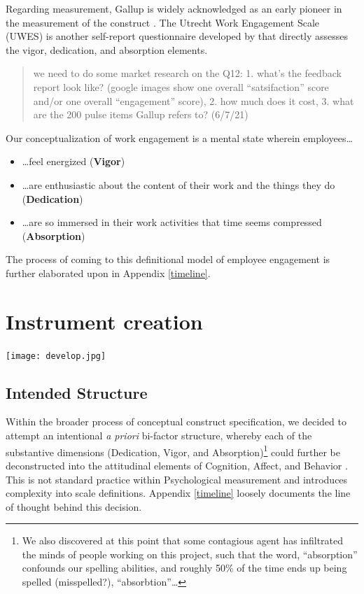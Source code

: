 \documentclass[
]{book}
\providecommand{\tightlist}{%
  \setlength{\itemsep}{0pt}\setlength{\parskip}{0pt}}
\begin{document}
Regarding measurement, Gallup is widely acknowledged as an early pioneer in the measurement of the construct \citep[see, for example,][]{coffman_hard_1999}. The Utrecht Work Engagement Scale (UWES) is another self-report questionnaire developed by \citet{schaufeli_uwesutrecht_2003} that directly assesses the vigor, dedication, and absorption elements.

\begin{quote}
we need to do some market research on the Q12: 1. what's the feedback report look like? (google images show one overall ``satsifaction'' score and/or one overall ``engagement'' score), 2. how much does it cost, 3. what are the 200 pulse items Gallup refers to? (6/7/21)
\end{quote}

Our conceptualization of work engagement is a mental state wherein employees\ldots{}

\begin{itemize}
\tightlist
\item
  \ldots feel energized (\textbf{Vigor})
\item
  \ldots are enthusiastic about the content of their work and the things they do (\textbf{Dedication})
\item
  \ldots are so immersed in their work activities that time seems compressed (\textbf{Absorption})
\end{itemize}

The process of coming to this definitional model of employee engagement is further elaborated upon in Appendix \ref{timeline}.

\hypertarget{instrument-creation}{%
\chapter{Instrument creation}\label{instrument-creation}}

\texttt{[image: develop.jpg]}

\hypertarget{ABCDAV}{%
\section{Intended Structure}\label{ABCDAV}}

Within the broader process of conceptual construct specification, we decided to attempt an intentional \emph{a priori} bi-factor structure, whereby each of the substantive dimensions (Dedication, Vigor, and Absorption)\footnote{We also discovered at this point that some contagious agent has infiltrated the minds of people working on this project, such that the word, ``absorption'' confounds our spelling abilities, and roughly 50\% of the time ends up being spelled (misspelled?), ``absorbtion''\ldots{}} could further be deconstructed into the attitudinal elements of Cognition, Affect, and Behavior \citep[see, for example,][]{eagly_psychology_1993, rosenberg_cognitive_1960}. This is not standard practice within Psychological measurement and introduces complexity into scale definitions. Appendix \ref{timeline} loosely documents the line of thought behind this decision.
\end{document}
